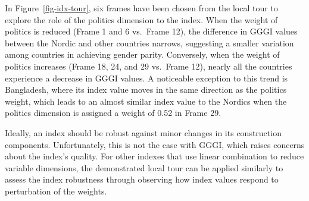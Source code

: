 \documentclass[
]{interact}
\begin{document}
In Figure~\ref{fig-idx-tour}, six frames have been chosen from the local
tour to explore the role of the politics dimension to the index. When
the weight of politics is reduced (Frame 1 and 6 vs.~Frame 12), the
difference in GGGI values between the Nordic and other countries
narrows, suggesting a smaller variation among countries in achieving
gender parity. Conversely, when the weight of politics increases (Frame
18, 24, and 29 vs.~Frame 12), nearly all the countries experience a
decrease in GGGI values. A noticeable exception to this trend is
Bangladesh, where its index value moves in the same direction as the
politics weight, which leads to an almost similar index value to the
Nordics when the politics dimension is assigned a weight of 0.52 in
Frame 29.

Ideally, an index should be robust against minor changes in its
construction components. Unfortunately, this is not the case with GGGI,
which raises concerns about the index's quality. For other indexes that
use linear combination to reduce variable dimensions, the demonstrated
local tour can be applied similarly to assess the index robustness
through observing how index values respond to perturbation of the
weights.
\end{document}
